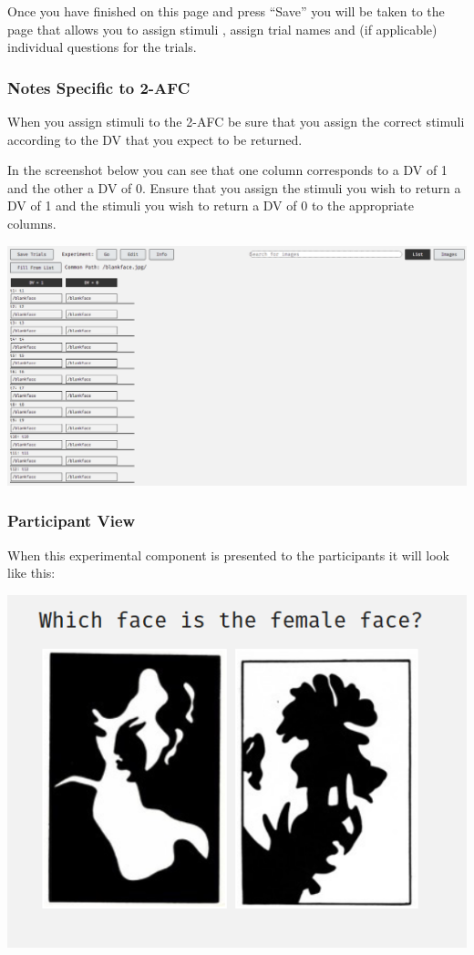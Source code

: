 \documentclass[]{book}
\begin{document}
Once you have finished on this page and press ``Save'' you will be taken
to the page that allows you to assign stimuli , assign trial names and
(if applicable) individual questions for the trials.

\hypertarget{twoafc_notes}{\subsubsection*{Notes Specific to
2-AFC}\label{twoafc_notes}}

When you assign stimuli to the 2-AFC be sure that you assign the correct
stimuli according to the DV that you expect to be returned.

In the screenshot below you can see that one column corresponds to a DV
of 1 and the other a DV of 0. Ensure that you assign the stimuli you
wish to return a DV of 1 and the stimuli you wish to return a DV of 0 to
the appropriate columns.

\includegraphics{images/screenshots/stim_2afc.png}

\subsubsection*{Participant View}\label{participant-view}

When this experimental component is presented to the participants it
will look like this:

\includegraphics{images/screenshots/view_2afc.png}
\end{document}
